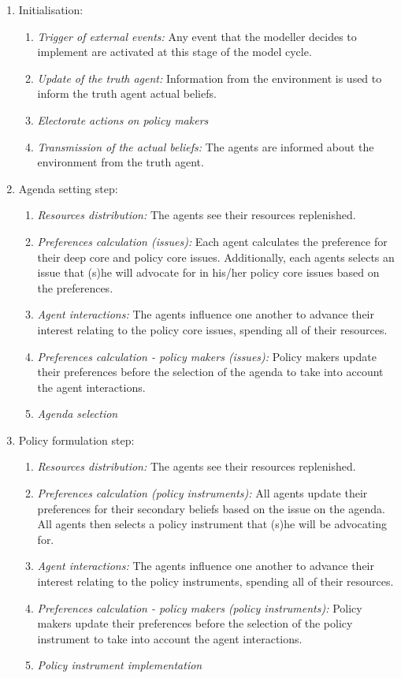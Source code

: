 \documentclass[11pt]{article}
\begin{document}
\begin{enumerate}
\item Initialisation:
	
	\begin{enumerate}
	\item \emph{Trigger of external events:} Any event that the modeller decides to implement are activated at this stage of the model cycle.
	\item \emph{Update of the truth agent:} Information from the environment is used to inform the truth agent actual beliefs.
	\item \emph{Electorate actions on policy makers}
	\item \emph{Transmission of the actual beliefs:} The agents are informed about the environment from the truth agent.
	\end{enumerate}
	
\item Agenda setting step:
	\begin{enumerate}
	\item \emph{Resources distribution:} The agents see their resources replenished.
	\item \emph{Preferences calculation (issues):} Each agent calculates the preference for their deep core and policy core issues. Additionally, each agents selects an issue that (s)he will advocate for in his/her policy core issues based on the preferences.
	\item \emph{Agent interactions:} The agents influence one another to advance their interest relating to the policy core issues, spending all of their resources.
	\item \emph{Preferences calculation - policy makers (issues):} Policy makers update their preferences before the selection of the agenda to take into account the agent interactions.
	\item \emph{Agenda selection}
	\end{enumerate}
	
\item Policy formulation step:
	\begin{enumerate}
	\item \emph{Resources distribution:} The agents see their resources replenished.
	\item \emph{Preferences calculation (policy instruments):} All agents update their preferences for their secondary beliefs based on the issue on the agenda. All agents then selects a policy instrument that (s)he will be advocating for.
	\item \emph{Agent interactions:} The agents influence one another to advance their interest relating to the policy instruments, spending all of their resources.
	\item \emph{Preferences calculation - policy makers (policy instruments):} Policy makers update their preferences before the selection of the policy instrument to take into account the agent interactions.
	\item \emph{Policy instrument implementation} 
	\end{enumerate}

\end{enumerate}
\end{document}
